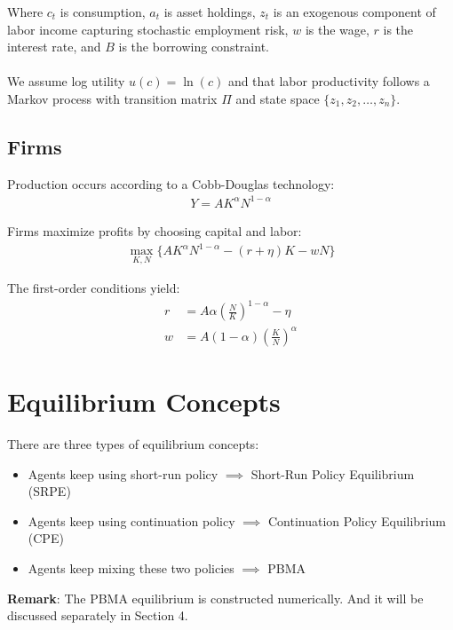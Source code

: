 \documentclass[11pt,a4paper]{article}
\begin{document}
\noindent Where $c_t$ is consumption, $a_t$ is asset holdings, $z_t$ is an exogenous component of labor income capturing stochastic employment risk, $w$ is the wage, $r$ is the interest rate, and $B$ is the borrowing constraint.\\
\\
\noindent We assume log utility $u(c) = \ln(c)$ and that labor productivity follows a Markov process with transition matrix $\Pi$ and state space $\{z_1, z_2, \ldots, z_n\}$.

\subsection{Firms}

\noindent Production occurs according to a Cobb-Douglas technology:
\begin{align}
Y = AK^\alpha N^{1-\alpha}
\end{align}

\noindent Firms maximize profits by choosing capital and labor:
\begin{align}
\max_{K,N} \{AK^\alpha N^{1-\alpha} - (r+\eta)K - wN\}
\end{align}

\noindent The first-order conditions yield:
\begin{align}
r &= A\alpha\left(\frac{N}{K}\right)^{1-\alpha} - \eta\\
w &= A(1-\alpha)\left(\frac{K}{N}\right)^{\alpha}
\end{align}

\section{Equilibrium Concepts}\label{sec:equilibrium}

There are three types of equilibrium concepts:

\begin{itemize}
    \item Agents keep using short-run policy $\implies$ Short-Run Policy Equilibrium (SRPE)
    \item Agents keep using continuation policy $\implies$ Continuation Policy Equilibrium (CPE)
    \item Agents keep mixing these two policies $\implies$ PBMA 
\end{itemize}

\noindent \textbf{Remark}: The PBMA equilibrium is constructed numerically. And it will be discussed separately in Section 4.
\end{document}
